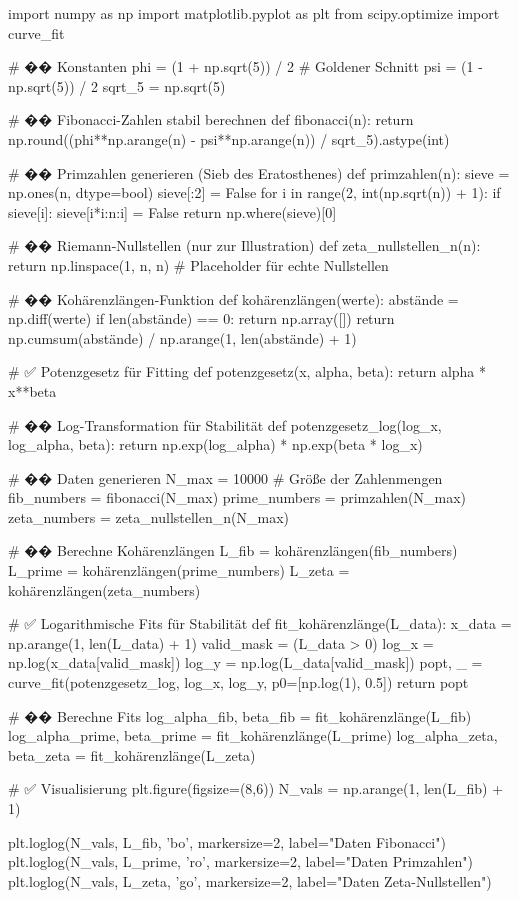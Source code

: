 import numpy as np
import matplotlib.pyplot as plt
from scipy.optimize import curve_fit

# �� Konstanten
phi = (1 + np.sqrt(5)) / 2  # Goldener Schnitt
psi = (1 - np.sqrt(5)) / 2
sqrt_5 = np.sqrt(5)

# �� Fibonacci-Zahlen stabil berechnen
def fibonacci(n):
    return np.round((phi**np.arange(n) - psi**np.arange(n)) / sqrt_5).astype(int)

# �� Primzahlen generieren (Sieb des Eratosthenes)
def primzahlen(n):
    sieve = np.ones(n, dtype=bool)
    sieve[:2] = False
    for i in range(2, int(np.sqrt(n)) + 1):
        if sieve[i]:
            sieve[i*i:n:i] = False
    return np.where(sieve)[0]

# �� Riemann-Nullstellen (nur zur Illustration)
def zeta_nullstellen_n(n):
    return np.linspace(1, n, n)  # Placeholder für echte Nullstellen

# �� Kohärenzlängen-Funktion
def kohärenzlängen(werte):
    abstände = np.diff(werte)
    if len(abstände) == 0:
        return np.array([])
    return np.cumsum(abstände) / np.arange(1, len(abstände) + 1)

# ✅ Potenzgesetz für Fitting
def potenzgesetz(x, alpha, beta):
    return alpha * x**beta

# �� Log-Transformation für Stabilität
def potenzgesetz_log(log_x, log_alpha, beta):
    return np.exp(log_alpha) * np.exp(beta * log_x)

# �� Daten generieren
N_max = 10000  # Größe der Zahlenmengen
fib_numbers = fibonacci(N_max)
prime_numbers = primzahlen(N_max)
zeta_numbers = zeta_nullstellen_n(N_max)

# �� Berechne Kohärenzlängen
L_fib = kohärenzlängen(fib_numbers)
L_prime = kohärenzlängen(prime_numbers)
L_zeta = kohärenzlängen(zeta_numbers)

# ✅ Logarithmische Fits für Stabilität
def fit_kohärenzlänge(L_data):
    x_data = np.arange(1, len(L_data) + 1)
    valid_mask = (L_data > 0)
    log_x = np.log(x_data[valid_mask])
    log_y = np.log(L_data[valid_mask])
    popt, _ = curve_fit(potenzgesetz_log, log_x, log_y, p0=[np.log(1), 0.5])
    return popt

# �� Berechne Fits
log_alpha_fib, beta_fib = fit_kohärenzlänge(L_fib)
log_alpha_prime, beta_prime = fit_kohärenzlänge(L_prime)
log_alpha_zeta, beta_zeta = fit_kohärenzlänge(L_zeta)

# ✅ Visualisierung
plt.figure(figsize=(8,6))
N_vals = np.arange(1, len(L_fib) + 1)

plt.loglog(N_vals, L_fib, 'bo', markersize=2, label="Daten Fibonacci")
plt.loglog(N_vals, L_prime, 'ro', markersize=2, label="Daten Primzahlen")
plt.loglog(N_vals, L_zeta, 'go', markersize=2, label="Daten Zeta-Nullstellen")

